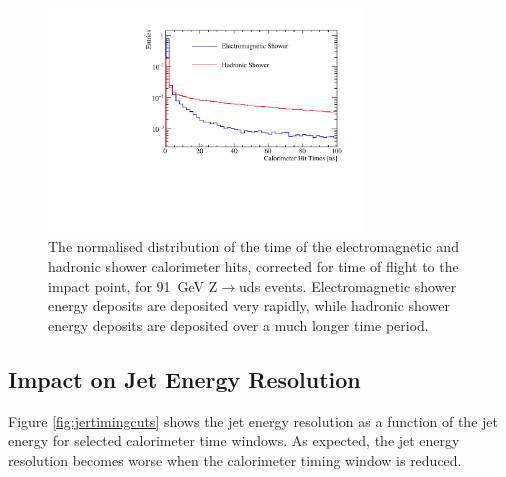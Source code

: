 \begin{figure}[h!]
\centering
\includegraphics[width=0.75\textwidth]{OptimisationStudies/Plots/Description/CalorimeterHitTimes_91GeV_Z_uds_Steel_Normalised.pdf}
\caption[The normalised distribution of the time of the electromagnetic and hadronic shower calorimeter hits, corrected for time of flight to the impact point, for 91~GeV Z$\rightarrow$uds events.  Electromagnetic shower energy deposits are deposited very rapidly, while hadronic shower energy deposits are deposited over a much longer time period.]{The normalised distribution of the time of the electromagnetic and hadronic shower calorimeter hits, corrected for time of flight to the impact point, for 91~GeV Z$\rightarrow$uds events.  Electromagnetic shower energy deposits are deposited very rapidly, while hadronic shower energy deposits are deposited over a much longer time period.}
\label{fig:calohittiming}
\end{figure} 


\subsection{Impact on Jet Energy Resolution}
Figure \ref{fig:jertimingcuts} shows the jet energy resolution as a function of the jet energy for selected calorimeter time windows.  As expected, the jet energy resolution becomes worse when the calorimeter timing window is reduced.  

